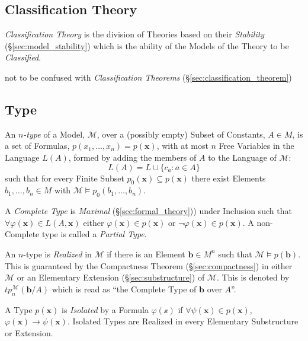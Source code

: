 \subsection{Classification Theory}\label{sec:classification_theory}

\emph{Classification Theory} is the division of Theories based on their
\emph{Stability} (\S\ref{sec:model_stability}) which is the ability of the
Models of the Theory to be \emph{Classified}.

\fist not to be confused with \emph{Classification Theorems}
(\S\ref{sec:classification_theorem})



\subsection{Type}\label{sec:model_type}

An \emph{$n$-type} of a Model, $\mathcal{M}$, over a (possibly empty)
Subset of Constants, $A \in M$, is a set of Formulas,
$p(x_1,\ldots,x_n) = p(\mathbf{x})$, with at most $n$ Free Variables
in the Language $L(A)$, formed by adding the members of $A$ to the
Language of $\mathcal{M}$:
\[
  L(A) = L \cup \{ c_a : a \in A \}
\]
such that for every Finite Subset $p_0(\mathbf{x}) \subseteq
p(\mathbf{x})$ there exist Elements $b_1,\ldots,b_n \in M$ with
$\mathcal{M} \models p_0(b_1,\ldots,b_n)$.

A \emph{Complete Type} is \emph{Maximal} (\S\ref{sec:formal_theory}))
under Inclusion such that $\forall \varphi(\mathbf{x}) \in
L(A,\mathbf{x})$ either $\varphi(\mathbf{x}) \in p(\mathbf{x})$ or
$\neg \varphi(\mathbf{x}) \in p(\mathbf{x})$. A non-Complete type is
called a \emph{Partial Type}.

An $n$-type is \emph{Realized} in $\mathcal{M}$ if there is an Element
$\mathbf{b} \in M^n$ such that $\mathcal{M} \models p(\mathbf{b})$.
This is guaranteed by the Compactness Theorem
(\S\ref{sec:compactness}) in either $\mathcal{M}$ or an Elementary
Extension (\S\ref{sec:substructure}) of $\mathcal{M}$. This is denoted
by $tp_{n}^{\mathcal{M}}(\mathbf{b}/A)$ which is read as ``the
Complete Type of $\mathbf{b}$ over $A$''.

A Type $p(\mathbf{x})$ is \emph{Isolated} by a Formula
$\varphi(\mathcal{x})$ if $\forall \psi(\mathbf{x}) \in
p(\mathbf{x})$, $\varphi (\mathbf{x}) \rightarrow
\psi(\mathbf{x})$. Isolated Types are Realized in every Elementary
Substructure or Extension.



